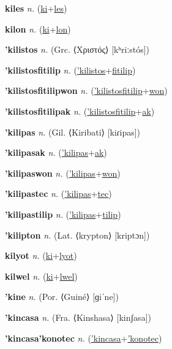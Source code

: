 \textbf{\hypertarget{kiles}{kiles}} \textit{n.} (\hyperlink{ki}{ki}+\allowbreak \hyperlink{les}{les})


\textbf{\hypertarget{kilon}{kilon}} \textit{n.} (\hyperlink{ki}{ki}+\allowbreak \hyperlink{lon}{lon})


\textbf{\hypertarget{'kilistos}{'kilistos}} \textit{n.} (Grc. ⟨Χριστός⟩ [kʰriːstós])


\textbf{\hypertarget{'kilistosfitilip}{'kilistosfitilip}} \textit{n.} (\hyperlink{'kilistos}{'kilistos}+\allowbreak \hyperlink{fitilip}{fitilip})


\textbf{\hypertarget{'kilistosfitilipwon}{'kilistosfitilipwon}} \textit{n.} (\hyperlink{'kilistosfitilip}{'kilistosfitilip}+\allowbreak \hyperlink{won}{won})


\textbf{\hypertarget{'kilistosfitilipak}{'kilistosfitilipak}} \textit{n.} (\hyperlink{'kilistosfitilip}{'kilistosfitilip}+\allowbreak \hyperlink{ak}{ak})


\textbf{\hypertarget{'kilipas}{'kilipas}} \textit{n.} (Gil. ⟨Kiribati⟩ [kiɾipas])


\textbf{\hypertarget{'kilipasak}{'kilipasak}} \textit{n.} (\hyperlink{'kilipas}{'kilipas}+\allowbreak \hyperlink{ak}{ak})


\textbf{\hypertarget{'kilipaswon}{'kilipaswon}} \textit{n.} (\hyperlink{'kilipas}{'kilipas}+\allowbreak \hyperlink{won}{won})


\textbf{\hypertarget{'kilipastec}{'kilipastec}} \textit{n.} (\hyperlink{'kilipas}{'kilipas}+\allowbreak \hyperlink{tec}{tec})


\textbf{\hypertarget{'kilipastilip}{'kilipastilip}} \textit{n.} (\hyperlink{'kilipas}{'kilipas}+\allowbreak \hyperlink{tilip}{tilip})


\textbf{\hypertarget{'kilipton}{'kilipton}} \textit{n.} (Lat. ⟨krypton⟩ [kriptɔn])


\textbf{\hypertarget{kilyot}{kilyot}} \textit{n.} (\hyperlink{ki}{ki}+\allowbreak \hyperlink{lyot}{lyot})


\textbf{\hypertarget{kilwel}{kilwel}} \textit{n.} (\hyperlink{ki}{ki}+\allowbreak \hyperlink{lwel}{lwel})


\textbf{\hypertarget{'kine}{'kine}} \textit{n.} (Por. ⟨Guiné⟩ [ɡiˈne])


\textbf{\hypertarget{'kincasa}{'kincasa}} \textit{n.} (Fra. ⟨Kinshasa⟩ [kinʃasa])


\textbf{\hypertarget{'kincasa'konotec}{'kincasa'konotec}} \textit{n.} (\hyperlink{'kincasa}{'kincasa}+\allowbreak \hyperlink{'konotec}{'konotec})


